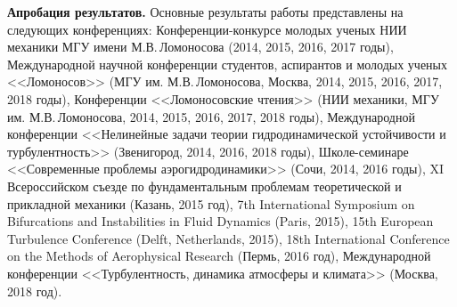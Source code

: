 \begin{comment}
{\bf Положения, выносимые на защиту.} Анализ модельных течений позволяет предложить следующий идеализированный цикл поддержания колебаний:

\noindent $1.$ В исследованных решениях поле скорости может быть представлено в виде суммы средней и пульсационной составляющих. Существенной особенностью среднего течения является наличие вытянутых вдоль потока полос повышенной и пониженной скорости. Пульсации возникают в результате линейной неустойчивости среднего течения в областях, расположенных между соседними полосами повышенной и пониженной скорости. В этих областях распределение средней продольной скорости имеет точки перегиба, если рассматривать его как функцию угловой (поперечной) координаты, что позволяет связать образование колебаний с неустойчивостью струйного течения с точками перегиба. 

\noindent $2.$ За поддержание полос повышенной и пониженной скорости ответственны продольные вихри, перемещающие жидкость в нормальной к основному потоку плоскости. Там, где медленная жидкость перемещается от стенки в основной поток, образуются полосы пониженной скорости. В промежуточных областях образуются полосы повышенной скорости. 

\noindent $3.$ Механизм поддержания продольных вихрей состоит в нелинейном взаимодействии пульсаций продольной скорости и пульсаций продольной завихренности. При этом в области расположения продольных вихрей пульсации продольной завихренности образуются в результате сжатия и растяжения существующих в потоке вихревых трубок пульсациями продольной скорости, что обеспечивает необходимую для поддержания продольных вихрей согласованность фаз между этими пульсациями. 
\end{comment}

{\bf Апробация результатов.} Основные результаты работы представлены на следующих конференциях: 
Конференции-конкурсе молодых ученых НИИ механики МГУ имени М.В.\,Ломоносова (2014, 2015, 2016, 2017 годы),
Международной научной конференции студентов, аспирантов и молодых ученых <<Ломоносов>> (МГУ им. М.В.\,Ломоносова, Москва, 2014, 2015, 2016, 2017, 2018 годы), 
Конференции <<Ломоносовские чтения>> (НИИ механики, МГУ им. М.В.\,Ломоносова, 2014, 2015, 2016, 2017, 2018 годы),
Международной конференции <<Нелинейные задачи теории гидродинамической устойчивости и турбулентность>> (Звенигород, 2014, 2016, 2018 годы),
Школе-семинаре <<Современные проблемы аэрогидродинамики>> (Сочи, 2014, 2016 годы),
XI Всероссийском съезде по фундаментальным проблемам теоретической и прикладной механики (Казань, 2015 год),
7th International Symposium on Bifurcations and Instabilities in Fluid Dynamics (Paris, 2015),
15th European Turbulence Conference (Delft, Netherlands, 2015),
18th International Conference on the Methods of Aerophysical Research (Пермь, 2016 год),
Международной конференции <<Турбулентность, динамика атмосферы и климата>> (Москва, 2018 год).

